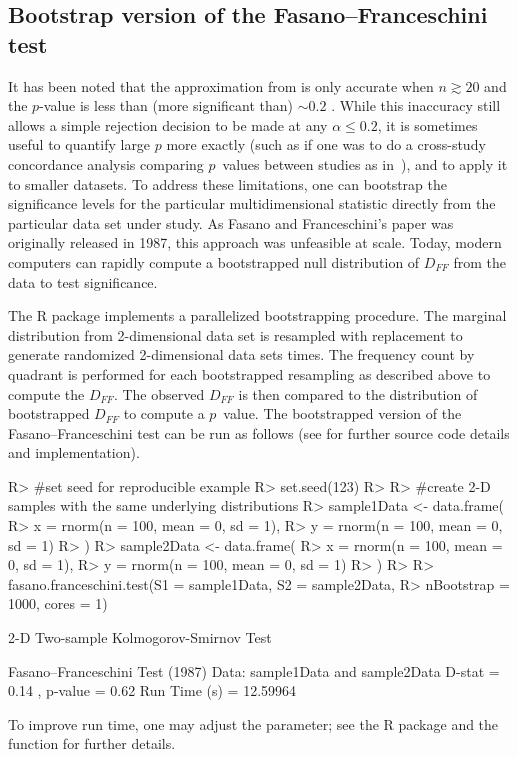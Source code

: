 \documentclass[codesnippet]{jss}
\newcommand{\fct}[1]{\code{#1()}}
\begin{document}
\subsection{Bootstrap version of the Fasano--Franceschini test}

It has been noted that the approximation from
\citet{numericalRecipes} is only accurate when $n \gtrsim 20$ and the
$p$-value is less than (more significant than) $\sim 0.2$
\citep{Babu2006}. While this inaccuracy still allows a simple
rejection decision to be made at any $\alpha\leq0.2$, it is sometimes
useful to quantify large $p$ more exactly (such as if one was to do a
cross-study concordance analysis comparing $p$~values between studies
as in~\cite{Ness-Cohn2020}), and to apply it to smaller datasets.
%
To address these limitations, one can bootstrap the significance
levels for the particular multidimensional statistic directly from the
particular data set under study. As Fasano and Franceschini's paper
was originally released in 1987, this approach was unfeasible at
scale.  Today, modern computers can rapidly compute a bootstrapped
null distribution of $D_{FF}$ from the data to test significance.

The  R package implements a parallelized
bootstrapping procedure. The marginal distribution from 2-dimensional
data set is resampled with replacement to generate randomized
2-dimensional data sets  times. The frequency count
by quadrant is performed for each bootstrapped resampling as described
above to compute the $D_{FF}$. The observed $D_{FF}$ is then compared
to the distribution of bootstrapped $D_{FF}$ to compute a $p$~value.
The bootstrapped version of the Fasano--Franceschini test can be
run as follows (see \fct{fasano.franceschini.test} for further
source code details and implementation).

\begin{CodeChunk}
\begin{CodeInput}
R> #set seed for reproducible example
R> set.seed(123)
R>
R> #create 2-D samples with the same underlying distributions
R> sample1Data <- data.frame(
R>  x = rnorm(n = 100, mean = 0, sd = 1),
R>  y = rnorm(n = 100, mean = 0, sd = 1)
R> )
R> sample2Data <- data.frame(
R>  x = rnorm(n = 100, mean = 0, sd = 1),
R>  y = rnorm(n = 100, mean = 0, sd = 1)
R> )
R>
R> fasano.franceschini.test(S1 = sample1Data, S2 = sample2Data,
R>                          nBootstrap = 1000, cores = 1)
\end{CodeInput}
\begin{CodeOutput}
      2-D Two-sample Kolmogorov-Smirnov Test

 Fasano--Franceschini Test (1987)
 Data:  sample1Data and sample2Data
 D-stat =  0.14 , p-value =  0.62
 Run Time (s) =  12.59964
\end{CodeOutput}
\end{CodeChunk}
To improve run time, one may adjust the  parameter; see the R  package and the \fct{mclapply} function for further details.
\end{document}
